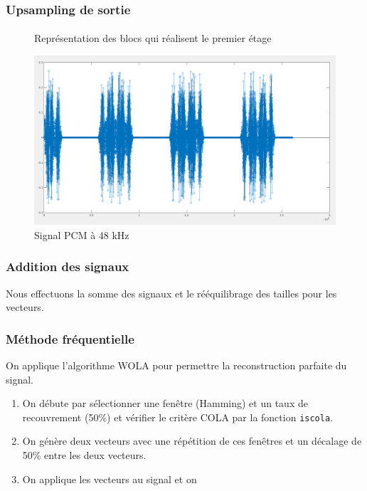 \documentclass[
10pt,
aspectratio=169,
]{beamer}
\begin{document}
\begin{frame}
\frametitle{Upsampling de sortie}
\framesubtitle{}
\begin{figure}[!h]
\center
{}
\caption{Représentation des blocs qui réalisent le premier étage}
\end{figure}

\begin{figure}[!h]
\center
\includegraphics[scale=0.3]{Images/output_poly.PNG} 
\caption{Signal PCM à 48 kHz}
\end{figure}
\end{frame}

\begin{frame}
\frametitle{Addition des signaux}
Nous effectuons la somme des signaux et le rééquilibrage des tailles pour les vecteurs.
\end{frame}

\begin{frame}
\frametitle{Méthode fréquentielle}
On applique l'algorithme WOLA pour permettre la reconstruction parfaite du signal. 
\begin{enumerate}
\item On débute par sélectionner une fenêtre (Hamming) et un taux de recouvrement (50\%) et vérifier le critère COLA par la fonction \texttt{iscola}.
\item On génère deux vecteurs avec une répétition de ces fenêtres et un décalage de 50\% entre les deux vecteurs.
\item On applique les vecteurs au signal et on 
\end{enumerate}
\end{frame}
\end{document}
